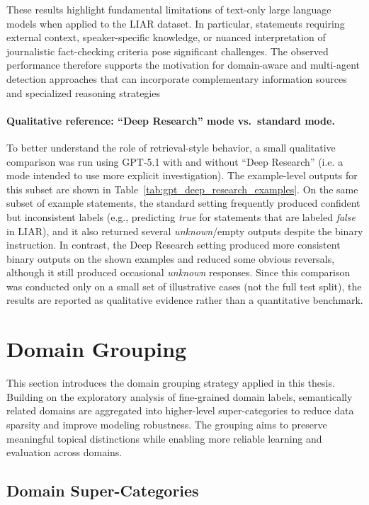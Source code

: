 These results highlight fundamental limitations of text-only large language models when applied to the LIAR dataset. In particular, statements requiring external context, speaker-specific knowledge, or nuanced interpretation of journalistic fact-checking criteria pose significant challenges. The observed performance therefore supports the motivation for domain-aware and multi-agent detection approaches that can incorporate complementary information sources and specialized reasoning strategies

\paragraph{Qualitative reference: ``Deep Research'' mode vs.\ standard mode.}

To better understand the role of retrieval-style behavior, a small qualitative comparison was run using GPT-5.1 with and without ``Deep Research'' (i.e. a mode intended to use more explicit investigation). The example-level outputs for this subset are shown in Table~\ref{tab:gpt_deep_research_examples}. On the same subset of example statements, the standard setting frequently produced confident but inconsistent labels (e.g., predicting \textit{true} for statements that are labeled \textit{false} in LIAR), and it also returned several \textit{unknown}/empty outputs despite the binary instruction. In contrast, the Deep Research setting produced more consistent binary outputs on the shown examples and reduced some obvious reversals, although it still produced occasional \textit{unknown} responses. Since this comparison was conducted only on a small set of illustrative cases (not the full test split), the results are reported as qualitative evidence rather than a quantitative benchmark.

\section{Domain Grouping}

This section introduces the domain grouping strategy applied in this thesis. Building on the exploratory analysis of fine-grained domain labels, semantically related domains are aggregated into higher-level super-categories to reduce data sparsity and improve modeling robustness. The grouping aims to preserve meaningful topical distinctions while enabling more reliable learning and evaluation across domains.

\subsection{Domain Super-Categories}

